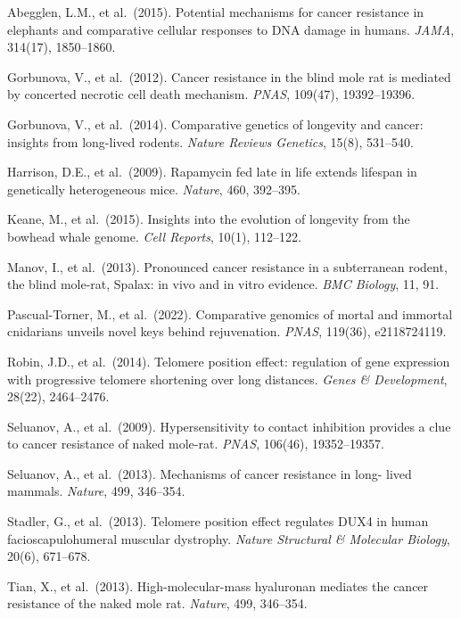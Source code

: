 \documentclass[12pt,a4paper]{article}
\begin{document}
\begin{enumerate}[label={[\arabic*]}, leftmargin=2.5em, itemsep=0.3em]

  \item Abegglen, L.M., et al.\ (2015). Potential mechanisms for cancer
    resistance in elephants and comparative cellular responses to DNA damage
    in humans. \textit{JAMA}, 314(17), 1850--1860.

  \item Gorbunova, V., et al.\ (2012). Cancer resistance in the blind mole
    rat is mediated by concerted necrotic cell death mechanism.
    \textit{PNAS}, 109(47), 19392--19396.

  \item Gorbunova, V., et al.\ (2014). Comparative genetics of longevity and
    cancer: insights from long-lived rodents. \textit{Nature Reviews
    Genetics}, 15(8), 531--540.

  \item Harrison, D.E., et al.\ (2009). Rapamycin fed late in life extends
    lifespan in genetically heterogeneous mice. \textit{Nature}, 460,
    392--395.

  \item Keane, M., et al.\ (2015). Insights into the evolution of longevity
    from the bowhead whale genome. \textit{Cell Reports}, 10(1), 112--122.

  \item Manov, I., et al.\ (2013). Pronounced cancer resistance in a subterranean
    rodent, the blind mole-rat, Spalax: in vivo and in vitro evidence.
    \textit{BMC Biology}, 11, 91.

  \item Pascual-Torner, M., et al.\ (2022). Comparative genomics of mortal and
    immortal cnidarians unveils novel keys behind rejuvenation.
    \textit{PNAS}, 119(36), e2118724119.

  \item Robin, J.D., et al.\ (2014). Telomere position effect: regulation of
    gene expression with progressive telomere shortening over long distances.
    \textit{Genes \& Development}, 28(22), 2464--2476.

  \item Seluanov, A., et al.\ (2009). Hypersensitivity to contact inhibition
    provides a clue to cancer resistance of naked mole-rat. \textit{PNAS},
    106(46), 19352--19357.

  \item Seluanov, A., et al.\ (2013). Mechanisms of cancer resistance in long-
    lived mammals. \textit{Nature}, 499, 346--354.

  \item Stadler, G., et al.\ (2013). Telomere position effect regulates DUX4
    in human facioscapulohumeral muscular dystrophy. \textit{Nature Structural
    \& Molecular Biology}, 20(6), 671--678.

  \item Tian, X., et al.\ (2013). High-molecular-mass hyaluronan mediates the
    cancer resistance of the naked mole rat. \textit{Nature}, 499, 346--354.

\end{enumerate}
\end{document}
